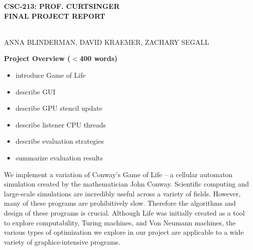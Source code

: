 \documentclass[12pt]{article}
\begin{document}
\setlength{\parindent}{3em}
\setlength{\parskip}{1em}


\newcommand{\ttspc}{\hspace{1mm}}
\newcommand{\tspc}{\hspace{2mm}}
\newcommand{\lspc}{\hspace{10mm}}
\newcommand{\ttc}{, \ttspc}
\newcommand{\nth}{^{\text{th}}}
\newcommand{\mybegit}{\vspace{-2mm} \begin{itemize} \itemsep-.6em }
\newcommand{\mytitle}[1]{\vspace{10mm} \noindent\begin{large} \textbf{{#1}} \end{large}} 
\newcommand{\soutt}[1]{%
    \renewcommand{\ULthickness}{1.0pt}%
       \sout{#1}%
    \renewcommand{\ULthickness}{.4pt}%
}



\begin{center}
\begin{Large} \textbf{CSC-213: PROF. CURTSINGER} \\
\vspace{3mm} \textbf{FINAL PROJECT REPORT} \end{Large} \\
\vspace{5mm} ANNA BLINDERMAN, DAVID KRAEMER, ZACHARY SEGALL
\end{center} 

\mytitle{Project Overview ($<$400 words)}
\mybegit
	\item introduce Game of Life
	\item describe GUI
	\item describe GPU stencil update
	\item describe listener CPU threads
	\item describe evaluation strategies
	\item summarize evaluation results
\end{itemize}

	We implement a variation of Conway's Game of Life -- a cellular automaton simulation created by the mathematician John Conway. Scientific computing and large-scale simulations are incredibly useful across a variety of fields. However, many of these programs are prohibitively slow. Therefore the algorithms and design of these programs is crucial. Although Life was initially created as a tool to explore computability, Turing machines, and Von Neumann machines, the various types of optimization we explore in our project are applicable to a wide variety of graphics-intensive programs. 
	
\end{document}
